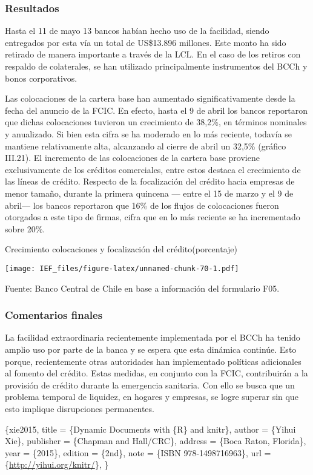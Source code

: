\documentclass[
]{book}
\begin{document}
\hypertarget{R3.3}{%
\subsubsection*{\texorpdfstring{\textbf{Resultados}}{Resultados}}\label{R3.3}}

Hasta el 11 de mayo 13 bancos habían hecho uso de la facilidad,
siendo entregados por esta vía un total de US\$13.896 millones.
Este monto ha sido retirado de manera importante a través de
la LCL. En el caso de los retiros con respaldo de colaterales, se
han utilizado principalmente instrumentos del BCCh y bonos
corporativos.

Las colocaciones de la cartera base han aumentado
significativamente desde la fecha del anuncio de la FCIC. En
efecto, hasta el 9 de abril los bancos reportaron que dichas
colocaciones tuvieron un crecimiento de 38,2\%, en términos
nominales y anualizado. Si bien esta cifra se ha moderado en lo
más reciente, todavía se mantiene relativamente alta, alcanzando
al cierre de abril un 32,5\% (gráfico III.21). El incremento de las
colocaciones de la cartera base proviene exclusivamente de los
créditos comerciales, entre estos destaca el crecimiento de las
líneas de crédito. Respecto de la focalización del crédito hacia
empresas de menor tamaño, durante la primera quincena ---
entre el 15 de marzo y el 9 de abril--- los bancos reportaron
que 16\% de los flujos de colocaciones fueron otorgados a este
tipo de firmas, cifra que en lo más reciente se ha incrementado
sobre 20\%.

Crecimiento colocaciones y focalización del crédito(porcentaje)

\texttt{[image: IEF\_files/figure-latex/unnamed-chunk-70-1.pdf]}

Fuente: Banco Central de Chile en base a información del formulario F05.

\hypertarget{R3.4}{%
\subsubsection*{\texorpdfstring{\textbf{Comentarios finales}}{Comentarios finales}}\label{R3.4}}

La facilidad extraordinaria recientemente implementada por el
BCCh ha tenido amplio uso por parte de la banca y se espera
que esta dinámica continúe. Esto porque, recientemente otras
autoridades han implementado políticas adicionales al fomento
del crédito. Estas medidas, en conjunto con la FCIC, contribuirán
a la provisión de crédito durante la emergencia sanitaria. Con
ello se busca que un problema temporal de liquidez, en hogares
y empresas, se logre superar sin que esto implique disrupciones
permanentes.

\citet{Book}\{xie2015,
title = \{Dynamic Documents with \{R\} and knitr\},
author = \{Yihui Xie\},
publisher = \{Chapman and Hall/CRC\},
address = \{Boca Raton, Florida\},
year = \{2015\},
edition = \{2nd\},
note = \{ISBN 978-1498716963\},
url = \{\url{http://yihui.org/knitr/}\},
\}

  
\end{document}
